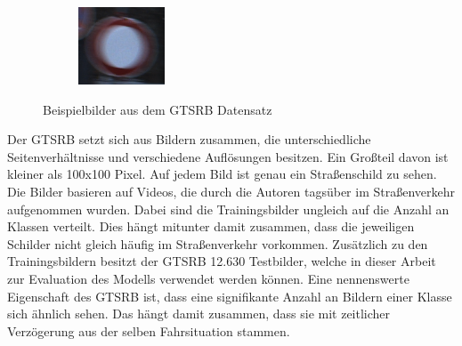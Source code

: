 \begin{figure}[H]
\begin{subfigure}[b]{0.125\textwidth}
       \caption{}
       \label{fig:gtrsb-paper-bsp-image-3}
   \end{subfigure}
   \hspace{3em}%
   \begin{subfigure}[b]{0.125\textwidth}
    \centering
    \includegraphics[height=\textwidth]{../images/GTSRB/00052.png}
    \caption{}
    \label{fig:gtrsb-paper-bsp-image-4}
\end{subfigure}
      \caption{Beispielbilder aus dem \acs{GTSRB} Datensatz \cite{GTSRB}}
      \label{fig:gtrsb-paper-bsp-images}
\end{figure}

Der \ac{GTSRB} setzt sich aus Bildern zusammen, die unterschiedliche Seitenverhältnisse und verschiedene Auflösungen besitzen. Ein Großteil davon ist kleiner als 100x100 Pixel. Auf jedem Bild ist genau ein Straßenschild zu sehen. Die Bilder basieren auf Videos, die durch die Autoren tagsüber im Straßenverkehr aufgenommen wurden. Dabei sind die Trainingsbilder ungleich auf die Anzahl an Klassen verteilt. Dies hängt mitunter damit zusammen, dass die jeweiligen Schilder nicht gleich häufig im Straßenverkehr vorkommen. Zusätzlich zu den Trainingsbildern besitzt der \ac{GTSRB} 12.630 Testbilder, welche in dieser Arbeit zur Evaluation des Modells verwendet werden können. Eine nennenswerte Eigenschaft des \ac{GTSRB} ist, dass eine signifikante Anzahl an Bildern einer Klasse sich ähnlich sehen. Das hängt damit zusammen, dass sie mit zeitlicher Verzögerung aus der selben Fahrsituation stammen. \cite{GTSRB}


